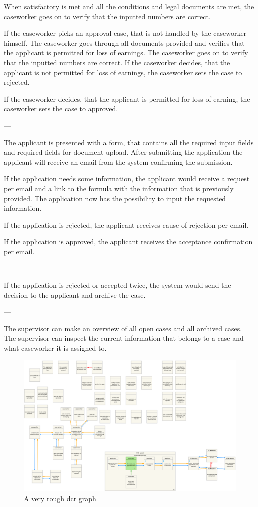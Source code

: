 When satisfactory is met and all the conditions and legal documents are met, the caseworker goes on to verify that the inputted numbers are correct.

If the caseworker picks an approval case, that is not handled by the caseworker himself. The caseworker goes through all documents provided and verifies that the applicant is permitted for loss of earnings. The caseworker goes on to verify that the inputted numbers are correct.
If the caseworker decides, that the applicant is not permitted for loss of earnings, the caseworker sets the case to rejected.

If the caseworker decides, that the applicant is permitted for loss of earning, the caseworker sets the case to approved.

---

The applicant is presented with a form, that contains all the required input fields and required fields for document upload. After submitting the application the applicant will receive an email from the system confirming the submission.

If the application needs some information, the applicant would receive a request per email and a link to the formula with the information that is previously provided. The application now has the possibility to input the requested information. 

If the application is rejected, the applicant receives cause of rejection per email.

If the application is approved, the applicant receives the acceptance confirmation per email. 

---

If the application is rejected or accepted twice, the system would send the decision to the applicant and archive the case. 

---

The supervisor can make an overview of all open cases and all archived cases. The supervisor can inspect the current information that belongs to a case and what caseworker it is assigned to.
\newpage
\begin{figure}[htb!]
	\includegraphics[width=\textwidth]{img/dcr}
	\caption{A very rough dcr graph}
\end{figure}